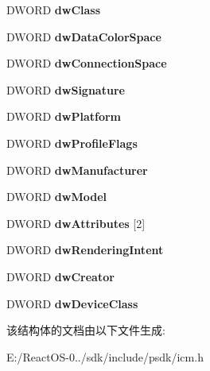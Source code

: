 \begin{DoxyCompactItemize}
D\+W\+O\+RD {\bfseries dw\+Class}
\item 
\mbox{\label{structtag_e_n_u_m_t_y_p_e_a_ac39a5f351f07d49a885302fcd5923e04}} 
D\+W\+O\+RD {\bfseries dw\+Data\+Color\+Space}
\item 
\mbox{\label{structtag_e_n_u_m_t_y_p_e_a_a506c3f527f50abf4cf36245f9a023a8e}} 
D\+W\+O\+RD {\bfseries dw\+Connection\+Space}
\item 
\mbox{\label{structtag_e_n_u_m_t_y_p_e_a_a92ece4ee6a7e1fd6280eba691b71ad9e}} 
D\+W\+O\+RD {\bfseries dw\+Signature}
\item 
\mbox{\label{structtag_e_n_u_m_t_y_p_e_a_a020e4d6a05c47c44eb44ff04f4a4a12b}} 
D\+W\+O\+RD {\bfseries dw\+Platform}
\item 
\mbox{\label{structtag_e_n_u_m_t_y_p_e_a_a80461e7ac879d3c8be94a9a02dfd4169}} 
D\+W\+O\+RD {\bfseries dw\+Profile\+Flags}
\item 
\mbox{\label{structtag_e_n_u_m_t_y_p_e_a_a61d91e5441b002135be507c877c9bb8a}} 
D\+W\+O\+RD {\bfseries dw\+Manufacturer}
\item 
\mbox{\label{structtag_e_n_u_m_t_y_p_e_a_a1a998e155f427a9e13c563c5e72344cc}} 
D\+W\+O\+RD {\bfseries dw\+Model}
\item 
\mbox{\label{structtag_e_n_u_m_t_y_p_e_a_a36370d5be6498315160b828bb83ff0df}} 
D\+W\+O\+RD {\bfseries dw\+Attributes} \mbox{[}2\mbox{]}
\item 
\mbox{\label{structtag_e_n_u_m_t_y_p_e_a_a8a1a8f2578102124a881d807767f0391}} 
D\+W\+O\+RD {\bfseries dw\+Rendering\+Intent}
\item 
\mbox{\label{structtag_e_n_u_m_t_y_p_e_a_abef75fa7398bae2626772ff1a07f83ea}} 
D\+W\+O\+RD {\bfseries dw\+Creator}
\item 
\mbox{\label{structtag_e_n_u_m_t_y_p_e_a_a648fb9a3483faacfcc2c7ad42fa7a12d}} 
D\+W\+O\+RD {\bfseries dw\+Device\+Class}
\end{DoxyCompactItemize}


该结构体的文档由以下文件生成\+:\begin{DoxyCompactItemize}
\item 
E\+:/\+React\+O\+S-\/0../sdk/include/psdk/icm.\+h\end{DoxyCompactItemize}
